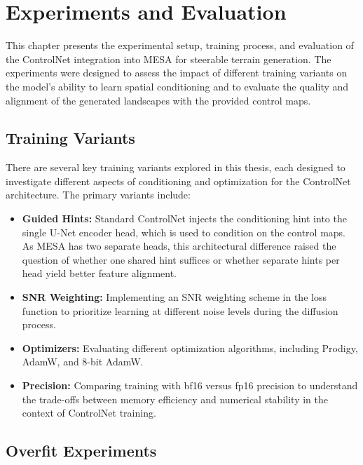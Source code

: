 \chapter{Experiments and Evaluation}
\label{cha:experiments}

This chapter presents the experimental setup, training process, and evaluation of the ControlNet integration into MESA for steerable terrain generation. The experiments were designed to assess the impact of different training variants on the model's ability to learn spatial conditioning and to evaluate the quality and alignment of the generated landscapes with the provided control maps.

\section{Training Variants}
\label{sec:training_variants}

There are several key training variants explored in this thesis, each designed to investigate different aspects of conditioning and optimization for the ControlNet architecture. The primary variants include:

\begin{itemize}
	\item \textbf{Guided Hints:} Standard ControlNet injects the conditioning hint into the single U-Net encoder head, which is used to condition on the control maps. As MESA has two separate heads, this architectural difference raised the question of whether one shared hint suffices or whether separate hints per head yield better feature alignment.
	\item \textbf{SNR Weighting:} Implementing an SNR weighting scheme in the loss function to prioritize learning at different noise levels during the diffusion process.
	\item \textbf{Optimizers:} Evaluating different optimization algorithms, including Prodigy, AdamW, and 8-bit AdamW.
	\item \textbf{Precision:} Comparing training with bf16 versus fp16 precision to understand the trade-offs between memory efficiency and numerical stability in the context of ControlNet training.
\end{itemize}

\section{Overfit Experiments}
\label{sec:overfit_experiments}

